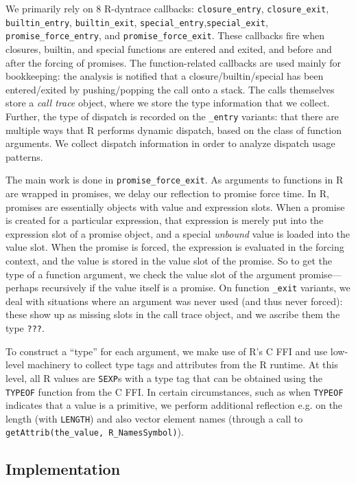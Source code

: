 \documentclass[acmsmall,review,anonymous]{acmart}\settopmatter{printfolios=true,printccs=false,printacmref=false}
\begin{document}
We primarily rely on 8 R-dyntrace callbacks: \texttt{closure\_entry}, \texttt{closure\_exit}, \texttt{builtin\_entry}, \texttt{builtin\_exit}, \texttt{special\_entry},\texttt{special\_exit}, \texttt{promise\_force\_entry}, and \texttt{promise\_force\_exit}.
These callbacks fire when closures, builtin, and special functions are entered and exited, and before and after the forcing of promises.
The function-related callbacks are used mainly for bookkeeping: the analysis is notified that a closure/builtin/special has been entered/exited by pushing/popping the call onto a stack.
The calls themselves store a {\it call trace} object, where we store the type information that we collect.
Further, the type of dispatch is recorded on the {\tt \_entry} variants:  that there are multiple ways that R performs dynamic dispatch, based on the class of function arguments.
We collect dispatch information in order to analyze dispatch usage patterns.

The main work is done in {\tt promise\_force\_exit}.
As arguments to functions in R are wrapped in promises, we delay our reflection to promise force time.
In R, promises are essentially objects with value and expression slots.
When a promise is created for a particular expression, that expression is merely put into the expression slot of a promise object, and a special {\it unbound} value is loaded into the value slot.
When the promise is forced, the expression is evaluated in the forcing context, and the value is stored in the value slot of the promise.
So to get the type of a function argument, we check the value slot of the argument promise---perhaps recursively if the value itself is a promise.
On function {\tt \_exit} variants, we deal with situations where an argument was never used (and thus never forced): these show up as missing slots in the call trace object, and we ascribe them the type {\tt ???}.

To construct a ``type'' for each argument, we make use of R's C FFI and use low-level machinery to collect type tags and attributes from the R runtime.
At this level, all R values are {\tt SEXP}s with a type tag that can be obtained using the {\tt TYPEOF} function from the C FFI.
In certain circumstances, such as when {\tt TYPEOF} indicates that a value is a primitive, we perform additional reflection e.g. on the length (with {\tt LENGTH}) and also vector element names (through a call to {\tt getAttrib(the\_value, R\_NamesSymbol)}).

\subsection{Implementation}
\end{document}
